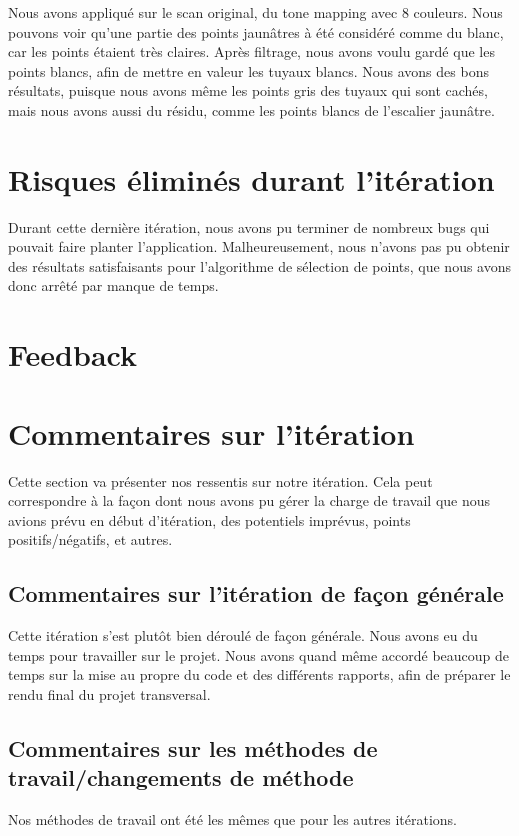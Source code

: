 \documentclass[12pt,titlepage,french]{article}
\begin{document}
Nous avons appliqué sur le scan original, du tone mapping avec 8 couleurs. Nous pouvons voir qu'une partie des points jaunâtres à été considéré comme du blanc, car les points étaient très claires. Après filtrage, nous avons voulu gardé que les points blancs, afin de mettre en valeur les tuyaux blancs. Nous avons des bons résultats, puisque nous avons même les points gris des tuyaux qui sont cachés, mais nous avons aussi du résidu, comme les points blancs de l'escalier jaunâtre.

\section{Risques éliminés durant l'itération}

Durant cette dernière itération, nous avons pu terminer de nombreux bugs qui pouvait faire planter l'application. Malheureusement, nous n'avons pas pu obtenir des résultats satisfaisants pour l'algorithme de sélection de points, que nous avons donc arrêté par manque de temps.

\section{Feedback}


\section{Commentaires sur l'itération}

Cette section va présenter nos ressentis sur notre itération. Cela peut correspondre à la façon dont nous avons pu gérer la charge de travail que nous avions prévu en début d'itération, des potentiels imprévus, points positifs/négatifs, et autres.

\subsection{Commentaires sur l'itération de façon générale}

Cette itération s'est plutôt bien déroulé de façon générale. Nous avons eu du temps pour travailler sur le projet. Nous avons quand même accordé beaucoup de temps sur la mise au propre du code et des différents rapports, afin de préparer le rendu final du projet transversal.

\subsection{Commentaires sur les méthodes de travail/changements de méthode}

Nos méthodes de travail ont été les mêmes que pour les autres itérations.
\end{document}
